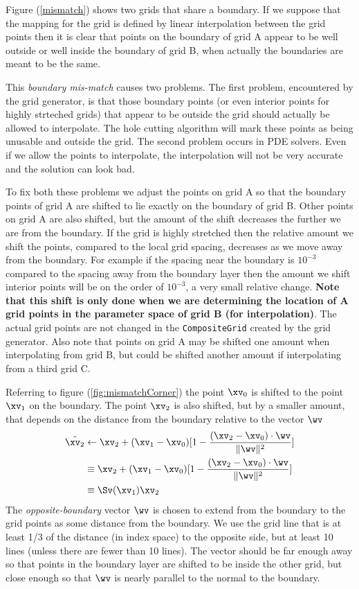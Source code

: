 Figure (\ref{mismatch}) shows two grids that share a boundary. If we suppose that the
mapping for the grid is defined by linear interpolation between the grid points then
it is clear that points on the boundary of grid A appear to be well outside or well inside
the boundary of grid B, when actually the boundaries are meant to be the same.

This {\sl boundary mis-match} causes two problems. The first problem, encountered by the grid generator,
is that those boundary points (or even interior points for highly strteched grids)
that appear to be outside the grid should actually be allowed 
to interpolate. The hole cutting algorithm will mark these points as being unusable and outside the grid.
The second problem occurs in PDE solvers. Even if we allow the points to interpolate, the interpolation will
not be very accurate and the solution can look bad.


To fix both these problems we adjust the points on grid A so that the boundary points of grid A
are shifted to lie exactly on the boundary of grid B. Other points on grid A are also
shifted, but the amount of the shift decreases the further we are from the boundary.
If the grid is highly stretched then the relative amount we shift the points, compared to the
local grid spacing, decreases as we move away from the boundary. For example if the spacing near
the boundary is $10^{-3}$ compared to the spacing away from the boundary layer then the amount we shift
interior points will be on the order of $10^{-3}$, a very small relative change.
{\bf Note that this shift is only done when we are determining the location of A grid points
in the parameter space of grid B (for interpolation)}. 
The actual grid points are not changed in the {\tt CompositeGrid}
created by the grid generator. Also note that points on grid A may be shifted one amount when interpolating
from grid B, but could be shifted another amount if interpolating from a third grid C.

Referring to figure (\ref{fig:mismatchCorner}) the point $\xv_0$ is shifted to the point $\xv_1$
on the boundary. The point $\xv_2$ is also shifted, but by a smaller amount, that depends
on the distance from the boundary relative to the vector $\wv$ 
\begin{align*}
   \tilde{\xv_2} & \leftarrow \xv_2 + (\xv_1-\xv_0)[ 1 - { (\xv_2-\xv_0)\cdot \wv \over \|\wv\|^2 } ] \\
                 & \equiv     \xv_2 + (\xv_1-\xv_0)[ 1 - { (\xv_2-\xv_0)\cdot \wv \over \|\wv\|^2 } ] \\
                 & \equiv \Sv(\xv_1) \xv_2 
\end{align*}
The {\sl opposite-boundary} vector $\wv$ is chosen to extend from the boundary to the grid points as some
distance from the boundary. We use the grid line that is at least 1/3 of the distance (in index space)
to the opposite side, but at least 10 lines (unless there are fewer than 10 lines). The vector should be
far enough away so that points in the boundary layer are shifted to be inside the other grid, but close enough
so that $\wv$ is nearly parallel to the normal to the boundary.

